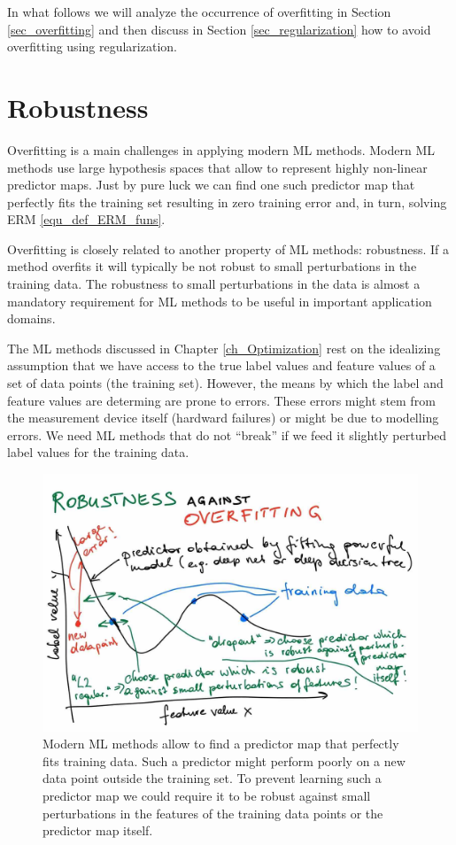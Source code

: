 \documentclass[12pt]{report}
\begin{document}
In what follows we will analyze the occurrence of overfitting 
in Section \ref{sec_overfitting} and then discuss in Section 
\ref{sec_regularization} how to avoid overfitting using regularization. 


\section{Robustness} 
\label{sec_robustness} 

Overfitting is a main challenges in applying modern ML methods. 
Modern ML methods use large hypothesis spaces that allow to 
represent highly non-linear predictor maps. Just by pure luck 
we can find one such predictor map that perfectly fits the 
training set resulting in zero training error and, in turn, solving 
ERM \eqref{equ_def_ERM_funs}. 

Overfitting is closely related to another property of ML methods: 
robustness. If a method overfits it will typically be not robust to 
small perturbations in the training data. The robustness to small 
perturbations in the data is almost a mandatory requirement for 
ML methods to be useful in important application domains. 

The ML methods discussed in Chapter \ref{ch_Optimization} rest on the 
idealizing assumption that we have access to the true label values and feature 
values of a set of data points (the training set). However, the means by which 
the label and feature values are determing are prone to errors. These errors might 
stem from the measurement device itself (hardward failures) or might be 
due to modelling errors. We need ML methods that do not ``break'' if we feed 
it slightly perturbed label values for the training data. 




 \begin{figure}[htbp]
	\centering
	\includegraphics[width=\textwidth]{RobustnessOverfitting.jpg}  
	\caption{Modern ML methods allow to find a predictor map that perfectly fits 
		training data. Such a predictor might perform poorly on a new data point 
		outside the training set. To prevent learning such a predictor 
		map we could require it to be robust against small perturbations in the features of the 
        training data points or the predictor map itself.}
	\label{fig_polyn_training}
\end{figure}
\end{document}
